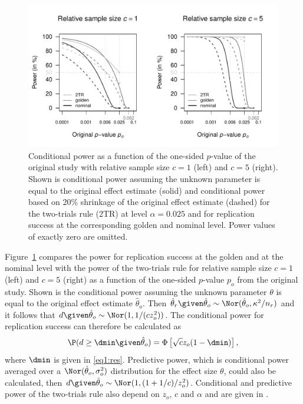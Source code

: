 \begin{figure}[!ht]
\begin{center}
\begin{knitrout}
\color{fgcolor}

{\centering \includegraphics[width=\maxwidth]{images/paper1/fig3-1}

}

\end{knitrout}
\end{center}
\caption{Conditional power as a function of the {one-sided} $p$-value of the
  original study with relative sample size $c=1$ (left) and $c=5$ (right). Shown
  is conditional power assuming the unknown parameter is equal to the original
  effect estimate (solid) and conditional power based on 20\% shrinkage of the
  original effect estimate (dashed) for the two-trials rule (2TR) at level
  $\alpha = 0.025$ and for replication success at the corresponding golden and
  nominal level. Power values of exactly zero are omitted.}
\label{fig1:fig3}
\end{figure}

Figure~\ref{fig1:fig3} compares the power for replication success
\citep[see][Section 4 for details]{Held2020} at the golden and at the nominal
level with the power of the two-trials rule for relative sample size $c = 1$
(left) and $c = 5$ (right) as a function of the one-sided $p$-value $p_o$ from
the original study. Shown is the conditional power assuming the unknown
parameter $\theta$ is equal to the original effect estimate $\hat \theta_o$.
Then $\hat \theta_r \given \hat \theta_o \sim \Nor(\hat \theta_o, \kappa^2/n_r)$
and it follows that $d \given \hat \theta_o \sim \Nor(1, 1/(c z_o^2))$. The
conditional power for replication success can therefore be calculated as
\begin{equation}\label{eq1:condPower}
\P(d \geq \dmin \given \hat \theta_o) = \Phi\left[\sqrt{c} z_o (1-\dmin)\right],
\end{equation}
where $\dmin$ is given in \eqref{eq1:res}. Predictive power, which is conditional
power averaged over a $\Nor(\hat \theta_o, \sigma_o^2)$ distribution for the
effect size $\theta$, could also be calculated, then
\mbox{$d \given \hat \theta_o \sim \Nor(1, (1+1/c)/z_o^2)$}. Conditional and
predictive power of the two-trials rule also depend on $z_o$, $c$ and $\alpha$
and are given in \citet{Micheloud2020}.

